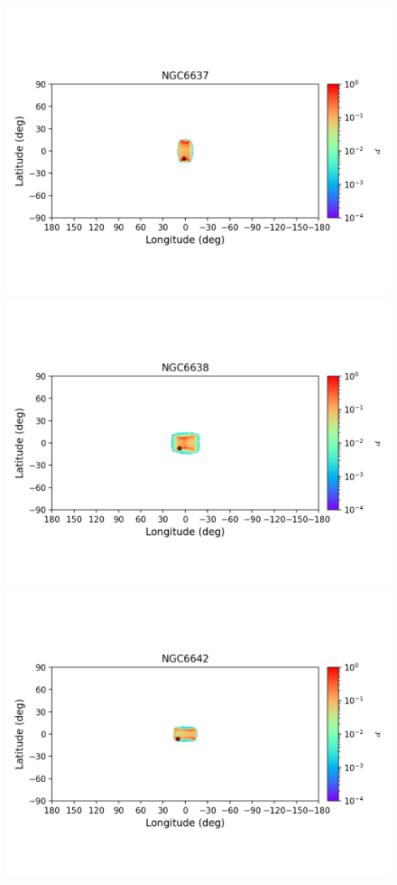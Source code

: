         \begin{figure}
        \includegraphics[clip=true, trim = 0mm 20mm 0mm 10mm, width=1\columnwidth]{images/error_plots_NGC6637.png}
        \includegraphics[clip=true, trim = 0mm 20mm 0mm 10mm, width=1\columnwidth]{images/error_plots_NGC6638.png}
        \includegraphics[clip=true, trim = 0mm 20mm 0mm 10mm, width=1\columnwidth]{images/error_plots_NGC6642.png}

\end{figure}
